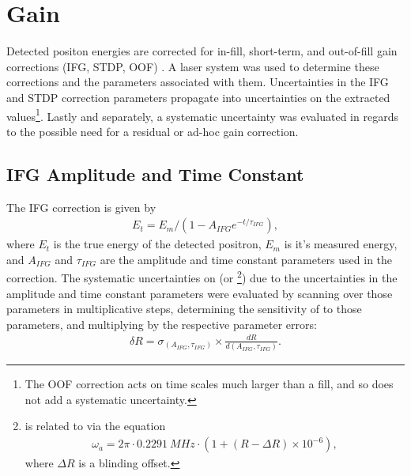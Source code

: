 
\graphicspath{{Body/Figures/Gain/IFG/60h/Amplitude/}{Body/Figures/Gain/IFG/60h/Amplitude-With-AdHoc/}{Body/Figures/Gain/IFG/60h/Lifetime/}{Body/Figures/Gain/IFG/9d/Lifetime/}{Body/Figures/Gain/ResidualGain/EnergyBinKloss/}{Body/Figures/Gain/ResidualGain/Chi2Min/}}

\section{Gain}


Detected positon energies are corrected for in-fill, short-term, and out-of-fill gain corrections (IFG, STDP, OOF) \cite[and references therein]{GainNote}. A laser system was used to determine these corrections and the parameters associated with them. Uncertainties in the IFG and STDP correction parameters propagate into uncertainties on the extracted \wa values\footnote{The OOF correction acts on time scales much larger than a fill, and so does not add a systematic uncertainty.}. Lastly and separately, a systematic uncertainty was evaluated in regards to the possible need for a residual or ad-hoc gain correction.



\subsection{IFG Amplitude and Time Constant}


The IFG correction is given by
\begin{align}
  E_{t} = E_{m}/(1 - A_{IFG} e^{-t/\tau_{IFG}}),
\end{align}
where $E_{t}$ is the true energy of the detected positron, $E_{m}$ is it's measured energy, and $A_{IFG}$ and $\tau_{IFG}$ are the amplitude and time constant parameters used in the correction. The systematic uncertainties on \wa (or \R\footnote{\R is related to \wa via the equation
\begin{align}
  \omega_{a} = 2\pi \cdot \SI{0.2291}{MHz} \cdot (1 + (R - \Delta R) \times 10^{-6}),
\label{eq:wa}
\end{align}
where $\Delta R$ is a blinding offset.}) due to the uncertainties in the amplitude and time constant parameters were evaluated by scanning over those parameters in multiplicative steps, determining the sensitivity of \R to those parameters, and multiplying by the respective parameter errors:
    \begin{align}
        \delta R = \sigma_{(A_{IFG}, \tau_{IFG})} \times \frac{dR}{d(A_{IFG}, \tau_{IFG})}.
    \end{align}


